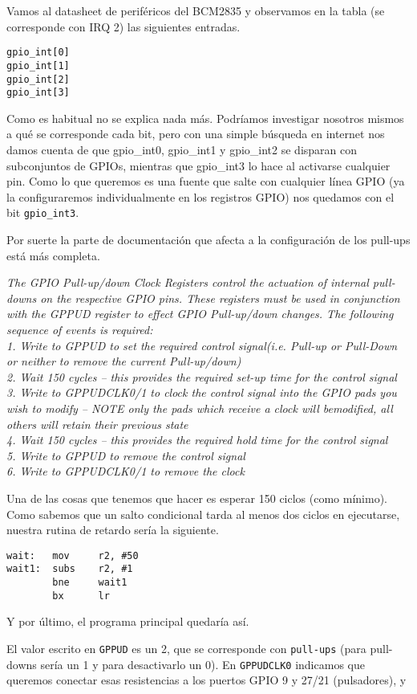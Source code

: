 Vamos al datasheet de periféricos del BCM2835 y observamos en la tabla (se corresponde con
IRQ 2) las siguientes entradas.

\begin{lstlisting}
gpio_int[0]
gpio_int[1]
gpio_int[2]
gpio_int[3]
\end{lstlisting}

Como es habitual no se explica nada más. Podríamos investigar nosotros mismos a qué se corresponde
cada bit, pero con una simple búsqueda en internet nos damos cuenta de que gpio\_int0, gpio\_int1 y
gpio\_int2 se disparan con subconjuntos de GPIOs, mientras que gpio\_int3 lo hace al activarse
cualquier pin. Como lo que queremos es una fuente
que salte con cualquier línea GPIO (ya la configuraremos individualmente en los registros GPIO)
nos quedamos con el bit {\tt gpio\_int3}.

Por suerte la parte de documentación que afecta a la configuración de los pull-ups está más
completa.

{\it
The GPIO Pull-up/down Clock Registers control the actuation of internal pull-downs on 
the respective GPIO pins. These registers must be used in conjunction with the GPPUD 
register  to  effect  GPIO  Pull-up/down  changes.  The  following  sequence  of  events  is 
required:\\
1.  Write to GPPUD to set the required control signal(i.e. Pull-up or Pull-Down or neither 
to remove the current Pull-up/down)\\
2.  Wait 150 cycles – this provides the required set-up time for the control signal\\
3.  Write to GPPUDCLK0/1 to clock the control signal into the GPIO pads you wish to 
modify – NOTE only the pads which receive a clock will bemodified, all others will 
retain their previous state\\
4.  Wait 150 cycles – this provides the required hold time for the control signal\\
5.  Write to GPPUD to remove the control signal\\
6.  Write to GPPUDCLK0/1 to remove the clock}

Una de las cosas que tenemos que hacer es esperar 150 ciclos (como mínimo). Como
sabemos que un salto condicional tarda al menos dos ciclos en ejecutarse, nuestra rutina
de retardo sería la siguiente.

\begin{lstlisting}
wait:   mov     r2, #50
wait1:  subs    r2, #1
        bne     wait1
        bx      lr
\end{lstlisting}

Y por último, el programa principal quedaría así.


El valor escrito en {\tt GPPUD} es un 2, que se corresponde con {\tt pull-ups} (para pull-downs
sería un 1 y para desactivarlo un 0). En {\tt GPPUDCLK0} indicamos que queremos conectar esas
resistencias a los puertos GPIO 9 y 27/21 (pulsadores), y 

\chapterend
